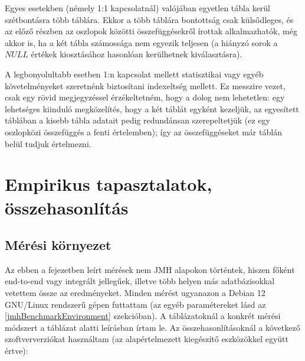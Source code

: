 \documentclass[
    parspace,
    noindent,
    nohyp,
]{elteiktdk}[2023/04/10]
\begin{document}
Egyes esetekben (némely 1:1 kapcsolatnál) valójában egyetlen tábla kerül szétbontásra több táblára.
Ekkor a több táblára bontottság csak külsődleges,
és az előző részben az oszlopok közötti összefüggésekről írottak alkalmazhatók,
még akkor is, ha a két tábla számossága nem egyezik teljesen
(a hiányzó sorok a $NULL$ értékek kiosztásához hasonlóan kerülhetnek kiválasztásra).

A legbonyolultabb esetben 1:n kapcsolat mellett statisztikai
vagy egyéb követelményeket szeretnénk biztosítani indexeltség mellett.
Ez messzire vezet, csak egy rövid megjegyzéssel érzékeltetném, hogy a dolog nem lehetetlen:
egy lehetséges kiinduló megközelítés, hogy a két táblát egyként kezeljük,
az egyesített táblában a kisebb tábla adatait pedig redundánsan szerepeltetjük
(ez egy oszlopközi összefüggés a fenti értelemben);
így az összefüggéseket már táblán belül tudjuk értelmezni.


\chapter{Empirikus tapasztalatok, összehasonlítás}


\section{Mérési környezet}

Az ebben a fejezetben leírt mérések nem JMH alapokon történtek,
hiszen főként end-to-end vagy integrált jellegűek,
illetve több helyen más adatbázisokkal vetettem össze az eredményeket.
Minden mérést ugyanazon a Debian 12 GNU/Linux rendszerű gépen futtattam
(az egyéb paramétereket lásd az \ref{jmhBenchmarkEnvironment} szekcióban).
A táblázatoknál a konkrét mérési módszert a táblázat alatti leírásban írtam le.
Az összehasonlításoknál a következő szoftververziókat használtam
(az alapértelmezett kiegészítő eszközökkel együtt értve):
\end{document}

